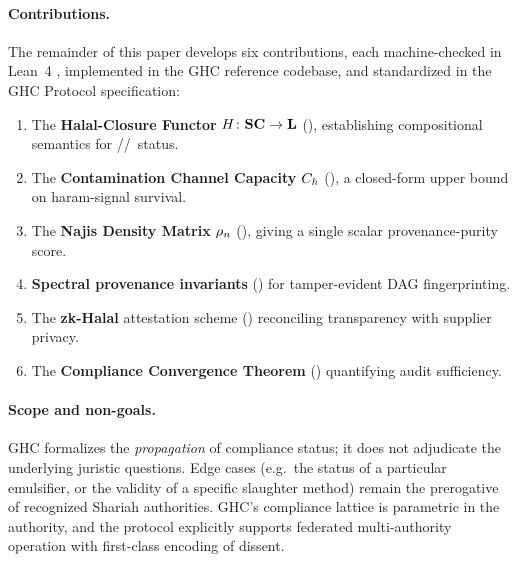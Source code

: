 \paragraph{Contributions.}
The remainder of this paper develops six contributions, each
machine-checked in Lean~4 \cite{lean4}, implemented in the GHC reference
codebase, and standardized in the GHC Protocol specification:
\begin{enumerate}
  \item The \textbf{Halal-Closure Functor} $H \colon \mathbf{SC} \to \mathbf{L}$
        (), establishing compositional semantics for
        \halal/\mashbuh/\haram\ status.
  \item The \textbf{Contamination Channel Capacity} $C_{h}$
        (), a closed-form upper bound on haram-signal
        survival.
  \item The \textbf{Najis Density Matrix} $\rho_{n}$
        (), giving a single scalar provenance-purity
        score.
  \item \textbf{Spectral provenance invariants} ()
        for tamper-evident DAG fingerprinting.
  \item The \textbf{zk-Halal} attestation scheme ()
        reconciling transparency with supplier privacy.
  \item The \textbf{Compliance Convergence Theorem}
        () quantifying audit sufficiency.
\end{enumerate}

\paragraph{Scope and non-goals.}
GHC formalizes the \emph{propagation} of compliance status; it does not
adjudicate the underlying juristic questions. Edge cases (e.g.\ the
status of a particular emulsifier, or the validity of a specific
slaughter method) remain the prerogative of recognized Shariah
authorities. GHC's compliance lattice is parametric in the authority,
and the protocol explicitly supports federated multi-authority operation
with first-class encoding of dissent.
